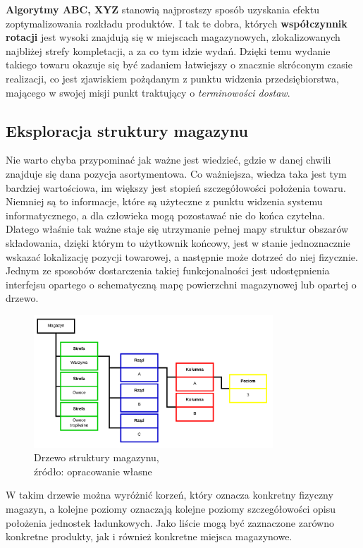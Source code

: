 		\textbf{Algorytmy ABC, XYZ} stanowią najprostszy sposób uzyskania efektu zoptymalizowania rozkładu produktów. I tak
		te dobra, których \textbf{współczynnik rotacji} jest wysoki znajdują się w miejscach magazynowych, zlokalizowanych
		najbliżej strefy kompletacji, a za co tym idzie wydań. Dzięki temu wydanie takiego towaru okazuje się być
		zadaniem łatwiejszy o znacznie skróconym czasie realizacji, co jest zjawiskiem pożądanym z punktu widzenia przedsiębiorstwa,
		mającego w swojej misji punkt traktujący o \textit{terminowości dostaw}. \\ 
	\subsection{Eksploracja struktury magazynu}
		Nie warto chyba przypominać jak ważne jest wiedzieć, gdzie w danej chwili znajduje się dana pozycja asortymentowa.
		Co ważniejsza, wiedza taka jest tym bardziej wartościowa, im większy jest stopień szczegółowości położenia towaru. 
		Niemniej są to informacje, które są użyteczne z punktu widzenia systemu informatycznego, a dla człowieka mogą
		pozostawać nie do końca czytelna. Dlatego właśnie tak ważne staje się utrzymanie pełnej mapy struktur obszarów
		składowania, dzięki którym to użytkownik końcowy, jest w stanie jednoznacznie wskazać lokalizację pozycji towarowej,
		a następnie może dotrzeć do niej fizycznie. Jednym ze sposobów dostarczenia takiej funkcjonalności jest 
		udostępnienia interfejsu opartego o schematyczną mapę powierzchni magazynowej lub opartej o drzewo. 
		\begin{figure}[h]
			\centering
			\includegraphics[width=0.8\textwidth]{images/warehouse_tree}
			\caption[Przykładowe drzewo eksploracji magazynu]{
				Drzewo struktury magazynu,\\
				źródło: opracowanie własne
			}
		\end{figure}
		W takim drzewie można wyróżnić korzeń, który oznacza konkretny fizyczny magazyn, a kolejne poziomy oznaczają 
		kolejne poziomy szczegółowości opisu położenia jednostek ładunkowych. Jako liście mogą być zaznaczone zarówno
		konkretne produkty, jak i również konkretne miejsca magazynowe. \\
		

